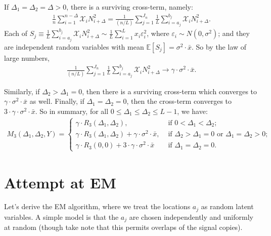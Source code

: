 \documentclass{article}
\theoremstyle{thm}
\theoremstyle{definition}
\newcommand{\E}{\mathbb{E}}
\newcommand{\ep}{\varepsilon}
\newcommand{\XX}{\mathcal{X}}
\newcommand{\1}{\mathbf{1}}
\begin{document}
If $\Delta_1 = \Delta_2 = \Delta > 0$, there is a surviving cross-term, namely:
%
\begin{align}
%
    \frac{1}{n} \sum_{i=1}^{n-\Delta} \XX_i N_{i+\Delta}^2
    = \frac{1}{(n/L)} \sum_{j=1}^{J_n} \frac{1}{L} \sum_{i=a_j}^{b_j} \XX_i N_{i+\Delta}^2.
%
\end{align}
%
Each of $S_j \equiv \frac{1}{L} \sum_{i=a_j}^{b_j} \XX_i N_{i+\Delta}^2 \sim \frac{1}{L} \sum_{i=1}^{L} x_i \ep_i^2$, where $\ep_i \sim N(0,\sigma^2)$; and they are independent random variables with mean $\E[S_j] = \sigma^2 \cdot \bar{x}$. So by the law of large numbers,
%
\begin{align}
%
    \frac{1}{(n/L)} \sum_{j=1}^{J_n} \frac{1}{L} \sum_{i=a_j}^{b_j} \XX_i N_{i+\Delta}^2
    \to \gamma \cdot \sigma^2 \cdot \bar{x}.
%
\end{align}

Similarly, if $\Delta_2 > \Delta_1 = 0$, then there is a surviving cross-term which converges to $\gamma \cdot \sigma^2 \cdot \bar{x}$ as well. Finally, if $\Delta_1 = \Delta_2 = 0$, then the cross-term converges to $3 \cdot \gamma  \cdot \sigma^2 \cdot \bar{x}$. So in summary, for all $0 \le \Delta_1 \le \Delta_2 \le L-1$, we have:
%
\begin{align}
%
    M_3(\Delta_1,\Delta_2,Y) = 
    \begin{cases}
        \gamma \cdot R_3(\Delta_1,\Delta_2), &\text{ if } 0 < \Delta_1 < \Delta_2; \\
        \gamma \cdot R_3(\Delta_1,\Delta_2) + \gamma \cdot \sigma^2 \cdot \bar{x},
                &\text{ if } \Delta_2 > \Delta_1 = 0 \text{ or } \Delta_1 = \Delta_2 > 0; \\
        \gamma \cdot R_3(0,0) + 3\cdot \gamma \cdot \sigma^2 \cdot \bar{x}
                &\text{ if } \Delta_1 = \Delta_2 = 0.
    \end{cases}
%
\end{align}

%


%
%
%


\section{Attempt at EM}

Let's derive the EM algorithm, where we treat the locations $a_j$ as random latent variables. A simple model is that the $a_j$ are chosen independently and uniformly at random (though take note that this permits overlaps of the signal copies).
\end{document}

